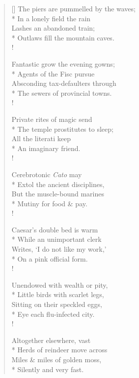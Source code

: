 \documentclass[MAIN]{subfiles}
\begin{document}
\settowidth{\versewidth}{The piers are pummelled by the waves;}
\begin{verse}[\versewidth]
The piers are pummelled by the waves;\\*
In a lonely field the rain\\
Lashes an abandoned train;\\*
Outlaws fill the mountain caves.\\!

Fantastic grow the evening gowns;\\*
Agents of the Fisc pursue\\
Absconding tax-defaulters through\\*
The sewers of provincial towns.\\!

Private rites of magic send\\*
The temple prostitutes to sleep;\\
All the literati keep\\*
An imaginary friend.\\!

Cerebrotonic \emph{Cato} may\\*
Extol the ancient disciplines,\\
But the muscle-bound marines\\*
Mutiny for food \& pay.\\!

Caesar's double bed is warm\\*
While an unimportant clerk\\
Writes, `I do not like my work,'\\*
On a pink official form.\\!

Unendowed with wealth or pity,\\*
Little birds with scarlet legs,\\
Sitting on their speckled eggs,\\*
Eye each flu-infected city.\\!

Altogether elsewhere, vast\\*
Herds of reindeer move across\\
Miles \& miles of golden moss,\\*
Silently and very fast.
\end{verse}
\end{document}
